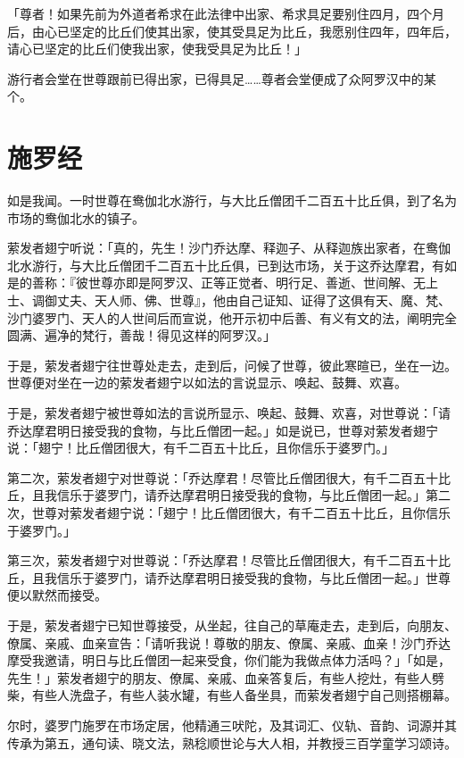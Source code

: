 「尊者！如果先前为外道者希求在此法律中出家、希求具足要别住四月，四个月后，由心已坚定的比丘们使其出家，使其受具足为比丘，我愿别住四年，四年后，请心已坚定的比丘们使我出家，使我受具足为比丘！」


游行者会堂在世尊跟前已得出家，已得具足……尊者会堂便成了众阿罗汉中的某个。

\section{施罗经}

如是我闻。一时世尊在鸯伽北水游行，与大比丘僧团千二百五十比丘俱，到了名为市场的鸯伽北水的镇子。


萦发者翅宁听说：「真的，先生！沙门乔达摩、释迦子、从释迦族出家者，在鸯伽北水游行，与大比丘僧团千二百五十比丘俱，已到达市场，关于这乔达摩君，有如是的善称：『彼世尊亦即是阿罗汉、正等正觉者、明行足、善逝、世间解、无上士、调御丈夫、天人师、佛、世尊』，他由自己证知、证得了这俱有天、魔、梵、沙门婆罗门、天人的人世间后而宣说，他开示初中后善、有义有文的法，阐明完全圆满、遍净的梵行，善哉！得见这样的阿罗汉。」


于是，萦发者翅宁往世尊处走去，走到后，问候了世尊，彼此寒暄已，坐在一边。世尊便对坐在一边的萦发者翅宁以如法的言说显示、唤起、鼓舞、欢喜。


于是，萦发者翅宁被世尊如法的言说所显示、唤起、鼓舞、欢喜，对世尊说：「请乔达摩君明日接受我的食物，与比丘僧团一起。」如是说已，世尊对萦发者翅宁说：「翅宁！比丘僧团很大，有千二百五十比丘，且你信乐于婆罗门。」

第二次，萦发者翅宁对世尊说：「乔达摩君！尽管比丘僧团很大，有千二百五十比丘，且我信乐于婆罗门，请乔达摩君明日接受我的食物，与比丘僧团一起。」第二次，世尊对萦发者翅宁说：「翅宁！比丘僧团很大，有千二百五十比丘，且你信乐于婆罗门。」

第三次，萦发者翅宁对世尊说：「乔达摩君！尽管比丘僧团很大，有千二百五十比丘，且我信乐于婆罗门，请乔达摩君明日接受我的食物，与比丘僧团一起。」世尊便以默然而接受。


于是，萦发者翅宁已知世尊接受，从坐起，往自己的草庵走去，走到后，向朋友、僚属、亲戚、血亲宣告：「请听我说！尊敬的朋友、僚属、亲戚、血亲！沙门乔达摩受我邀请，明日与比丘僧团一起来受食，你们能为我做点体力活吗？」「如是，先生！」萦发者翅宁的朋友、僚属、亲戚、血亲答复后，有些人挖灶，有些人劈柴，有些人洗盘子，有些人装水罐，有些人备坐具，而萦发者翅宁自己则搭棚幕。


尔时，婆罗门施罗在市场定居，他精通三吠陀，及其词汇、仪轨、音韵、词源并其传承为第五，通句读、晓文法，熟稔顺世论与大人相，并教授三百学童学习颂诗。


